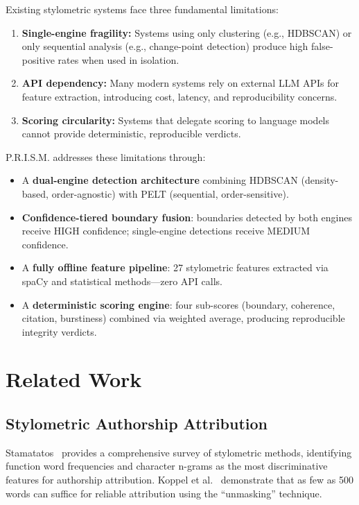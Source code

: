 \documentclass[conference]{IEEEtran}
\begin{document}
Existing stylometric systems face three fundamental limitations:
\begin{enumerate}
    \item \textbf{Single-engine fragility:} Systems using only clustering (e.g., HDBSCAN) or only sequential analysis (e.g., change-point detection) produce high false-positive rates when used in isolation.
    \item \textbf{API dependency:} Many modern systems rely on external LLM APIs for feature extraction, introducing cost, latency, and reproducibility concerns.
    \item \textbf{Scoring circularity:} Systems that delegate scoring to language models cannot provide deterministic, reproducible verdicts.
\end{enumerate}

P.R.I.S.M. addresses these limitations through:
\begin{itemize}
    \item A \textbf{dual-engine detection architecture} combining HDBSCAN (density-based, order-agnostic) with PELT (sequential, order-sensitive).
    \item \textbf{Confidence-tiered boundary fusion}: boundaries detected by both engines receive HIGH confidence; single-engine detections receive MEDIUM confidence.
    \item A \textbf{fully offline feature pipeline}: 27 stylometric features extracted via spaCy and statistical methods---zero API calls.
    \item A \textbf{deterministic scoring engine}: four sub-scores (boundary, coherence, citation, burstiness) combined via weighted average, producing reproducible integrity verdicts.
\end{itemize}

\section{Related Work}
\label{sec:related}

\subsection{Stylometric Authorship Attribution}
Stamatatos~\cite{stamatatos2009} provides a comprehensive survey of stylometric methods, identifying function word frequencies and character n-grams as the most discriminative features for authorship attribution. Koppel et al.~\cite{koppel2009} demonstrate that as few as 500 words can suffice for reliable attribution using the ``unmasking'' technique.
\end{document}

